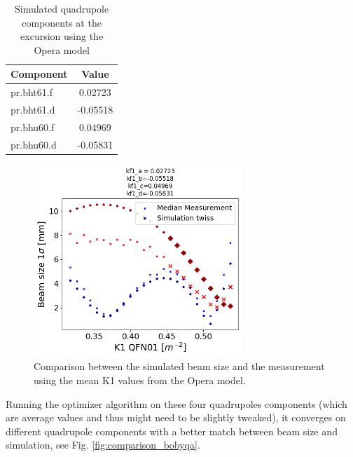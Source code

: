 \begin{table}[htbp]
\centering
\caption{Simulated quadrupole components at the excursion using the Opera model}
\label{tab:quadrupole_components}
\begin{tabular}{|l|c|}
\hline
Component & Value \\
\hline
pr.bht61.f & 0.02723 \\
pr.bht61.d & -0.05518 \\
pr.bhu60.f & 0.04969 \\
pr.bhu60.d & -0.05831 \\
\hline
\end{tabular}
\end{table}

\begin{figure}[H]
\centering
\includegraphics[width=0.7\textwidth]{02_Simulation/images/comparison_sim_meas_four_compo.png}
\caption{Comparison between the simulated beam size and the measurement using the mean K1 values from the Opera model.}
\label{fig:comparison_four_compo}
\end{figure}

Running the optimizer algorithm on these four quadrupoles components (which are average values and thus might need to be slightly tweaked), it converges on different quadrupole components with a better match between beam size and simulation, see Fig. \ref{fig:comparison_bobyqa}.

